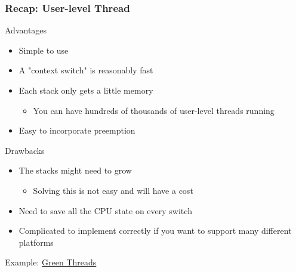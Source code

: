 \begin{frame}[fragile]
	\frametitle{Recap: User-level Thread}
	{\color{red}Advantages}
	
	\begin{itemize}
		\item Simple to use
		\item A "context switch" is reasonably fast
		\item Each stack only gets a little memory
		\begin{itemize}
			\item You can have hundreds of thousands of user-level threads running
		\end{itemize}
		\item Easy to incorporate preemption
	\end{itemize}
	
	{\color{red}Drawbacks}
	
	\begin{itemize}
		\item The stacks might need to grow
		\begin{itemize}
			\item Solving this is not easy and will have a cost
		\end{itemize}
		\item Need to save all the CPU state on every switch
		\item Complicated to implement correctly if you want to support many different platforms
	\end{itemize}
	
	Example: \href{https://cfsamson.github.io/books-futures-explained/0_background_information.html#green-threads}{Green Threads}
	
\end{frame}


